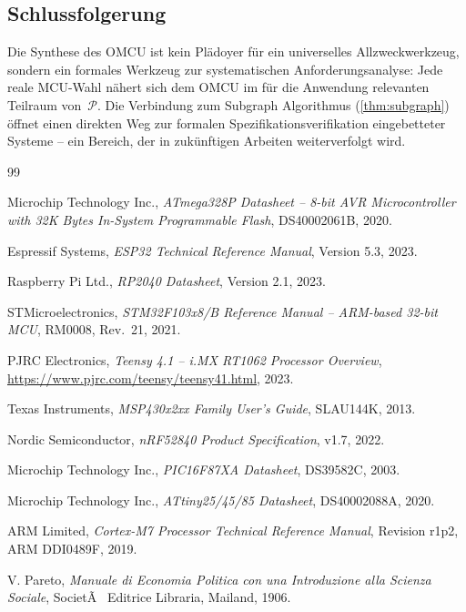 ﻿\documentclass[12pt, a4paper]{article}
\theoremstyle{plain}
\theoremstyle{definition}
\theoremstyle{remark}
\newcommand{\omcu}{\textsc{OMCU}}
\begin{document}
\subsection{Schlussfolgerung}

Die Synthese des \omcu{} ist kein Plädoyer für ein universelles
Allzweckwerkzeug, sondern ein formales Werkzeug zur systematischen
Anforderungsanalyse: Jede reale MCU-Wahl nähert sich dem \omcu{}
im für die Anwendung relevanten Teilraum von~$\mathcal{P}$.
Die Verbindung zum Subgraph Algorithmus (\cref{thm:subgraph}) öffnet
einen direkten Weg zur formalen Spezifikationsverifikation eingebetteter
Systeme -- ein Bereich, der in zukünftigen Arbeiten weiterverfolgt wird.

\begin{thebibliography}{99}

Microchip Technology Inc.,
\textit{ATmega328P Datasheet -- 8-bit AVR Microcontroller with 32K Bytes In-System Programmable Flash},
DS40002061B, 2020.

Espressif Systems,
\textit{ESP32 Technical Reference Manual},
Version 5.3, 2023.

Raspberry Pi Ltd.,
\textit{RP2040 Datasheet},
Version 2.1, 2023.

STMicroelectronics,
\textit{STM32F103x8/B Reference Manual -- ARM-based 32-bit MCU},
RM0008, Rev.~21, 2021.

PJRC Electronics,
\textit{Teensy 4.1 -- i.MX RT1062 Processor Overview},
\url{https://www.pjrc.com/teensy/teensy41.html}, 2023.

Texas Instruments,
\textit{MSP430x2xx Family User's Guide},
SLAU144K, 2013.

Nordic Semiconductor,
\textit{nRF52840 Product Specification},
v1.7, 2022.

Microchip Technology Inc.,
\textit{PIC16F87XA Datasheet},
DS39582C, 2003.

Microchip Technology Inc.,
\textit{ATtiny25/45/85 Datasheet},
DS40002088A, 2020.

ARM Limited,
\textit{Cortex-M7 Processor Technical Reference Manual},
Revision r1p2, ARM DDI0489F, 2019.

V. Pareto,
\textit{Manuale di Economia Politica con una Introduzione alla Scienza Sociale},
SocietÃ  Editrice Libraria, Mailand, 1906.


\end{thebibliography}
\end{document}
